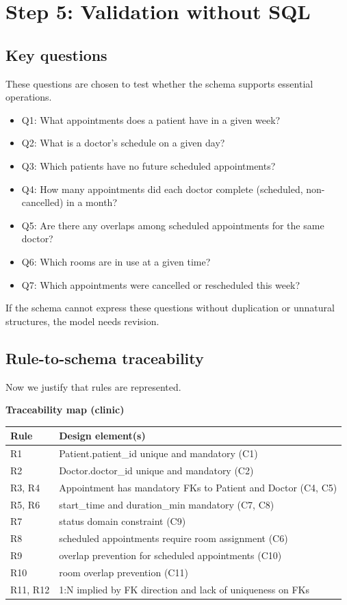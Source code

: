 \section{Step 5: Validation without SQL}

\subsection{Key questions}
These questions are chosen to test whether the schema supports essential operations.

\begin{itemize}
  \item Q1: What appointments does a patient have in a given week?
  \item Q2: What is a doctor’s schedule on a given day?
  \item Q3: Which patients have no future scheduled appointments?
  \item Q4: How many appointments did each doctor complete (scheduled, non-cancelled) in a month?
  \item Q5: Are there any overlaps among scheduled appointments for the same doctor?
  \item Q6: Which rooms are in use at a given time?
  \item Q7: Which appointments were cancelled or rescheduled this week?
\end{itemize}

If the schema cannot express these questions without duplication or unnatural structures, the model needs revision.

\subsection{Rule-to-schema traceability}
Now we justify that rules are represented.

\begin{examplebox}
\textbf{Traceability map (clinic)}\\[4pt]
\begin{tabularx}{\textwidth}{@{}lX@{}}
\toprule
Rule & Design element(s) \\
\midrule
R1 & Patient.patient\_id unique and mandatory (C1) \\
R2 & Doctor.doctor\_id unique and mandatory (C2) \\
R3, R4 & Appointment has mandatory FKs to Patient and Doctor (C4, C5) \\
R5, R6 & start\_time and duration\_min mandatory (C7, C8) \\
R7 & status domain constraint (C9) \\
R8 & scheduled appointments require room assignment (C6) \\
R9 & overlap prevention for scheduled appointments (C10) \\
R10 & room overlap prevention (C11) \\
R11, R12 & 1:N implied by FK direction and lack of uniqueness on FKs \\
\bottomrule
\end{tabularx}
\end{examplebox}


